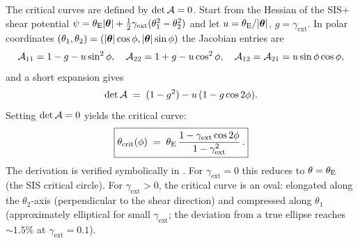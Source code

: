 The critical curves are defined by $\det\mathcal{A} = 0$.  Start from the
Hessian of the SIS$+$shear potential
$\psi = \theta_{\mathrm{E}}|\boldsymbol{\theta}| + \tfrac{1}{2}\gamma_{\mathrm{ext}}(\theta_1^2 - \theta_2^2)$
and let $u = \theta_{\mathrm{E}}/|\boldsymbol{\theta}|$, $g = \gamma_{\mathrm{ext}}$.  In
polar coordinates $(\theta_1,\theta_2) = (|\boldsymbol{\theta}|\cos\phi,
|\boldsymbol{\theta}|\sin\phi)$ the Jacobian entries are
\begin{equation*}
    \mathcal{A}_{11} = 1 - g - u\sin^2\phi,
    \quad
    \mathcal{A}_{22} = 1 + g - u\cos^2\phi,
    \quad
    \mathcal{A}_{12} = \mathcal{A}_{21} = u\sin\phi\cos\phi,
\end{equation*}
and a short expansion gives
\begin{equation*}
    \det\mathcal{A} \;=\; (1-g^2) - u\,(1 - g\cos 2\phi).
\end{equation*}
Setting $\det\mathcal{A} = 0$ yields the critical curve:
\begin{equation}
    \boxed{
    \theta_{\mathrm{crit}}(\phi)
    \;=\; \theta_{\mathrm{E}}\,
        \frac{1 - \gamma_{\mathrm{ext}}\cos 2\phi}{1 - \gamma_{\mathrm{ext}}^2} \,.
    }
    \label{eq:crit_sis_shear}
\end{equation}
The derivation is verified symbolically in
.
For $\gamma_{\mathrm{ext}} = 0$ this reduces to $\theta = \theta_{\mathrm{E}}$
(the SIS critical circle).  For $\gamma_{\mathrm{ext}} > 0$, the
critical curve is an oval: elongated along the
$\theta_2$-axis (perpendicular to the shear direction) and compressed
along $\theta_1$ (approximately elliptical for small
$\gamma_{\mathrm{ext}}$; the deviation from a true ellipse reaches
${\sim}1.5\%$ at $\gamma_{\mathrm{ext}} = 0.1$).

